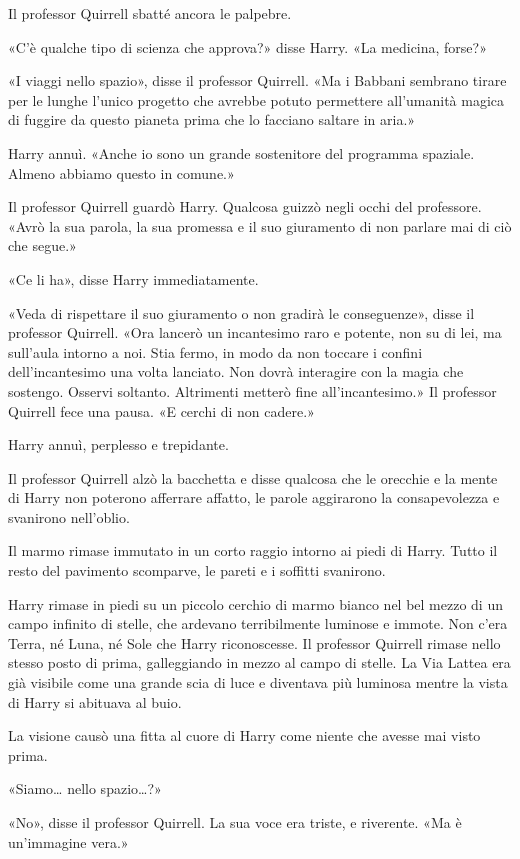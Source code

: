 Il professor Quirrell sbatté ancora le palpebre.

«C’è qualche tipo di scienza che approva?» disse Harry. «La medicina, forse?»

«I viaggi nello spazio», disse il professor Quirrell. «Ma i Babbani sembrano tirare per le lunghe l’unico progetto che avrebbe potuto permettere all’umanità magica di fuggire da questo pianeta prima che lo facciano saltare in aria.»

Harry annuì. «Anche io sono un grande sostenitore del programma spaziale. Almeno abbiamo questo in comune.»

Il professor Quirrell guardò Harry. Qualcosa guizzò negli occhi del professore. «Avrò la sua parola, la sua promessa e il suo giuramento di non parlare mai di ciò che segue.»

«Ce li ha», disse Harry immediatamente.

«Veda di rispettare il suo giuramento o non gradirà le conseguenze», disse il professor Quirrell. «Ora lancerò un incantesimo raro e potente, non su di lei, ma sull’aula intorno a noi. Stia fermo, in modo da non toccare i confini dell’incantesimo una volta lanciato. Non dovrà interagire con la magia che sostengo. Osservi soltanto. Altrimenti metterò fine all’incantesimo.» Il professor Quirrell fece una pausa. «E cerchi di non cadere.»

Harry annuì, perplesso e trepidante.

Il professor Quirrell alzò la bacchetta e disse qualcosa che le orecchie e la mente di Harry non poterono afferrare affatto, le parole aggirarono la consapevolezza e svanirono nell’oblio.

Il marmo rimase immutato in un corto raggio intorno ai piedi di Harry. Tutto il resto del pavimento scomparve, le pareti e i soffitti svanirono.

Harry rimase in piedi su un piccolo cerchio di marmo bianco nel bel mezzo di un campo infinito di stelle, che ardevano terribilmente luminose e immote. Non c’era Terra, né Luna, né Sole che Harry riconoscesse. Il professor Quirrell rimase nello stesso posto di prima, galleggiando in mezzo al campo di stelle. La Via Lattea era già visibile come una grande scia di luce e diventava più luminosa mentre la vista di Harry si abituava al buio.

La visione causò una fitta al cuore di Harry come niente che avesse mai visto prima.

«Siamo… nello spazio…?»

«No», disse il professor Quirrell. La sua voce era triste, e riverente. «Ma è un’immagine vera.»

